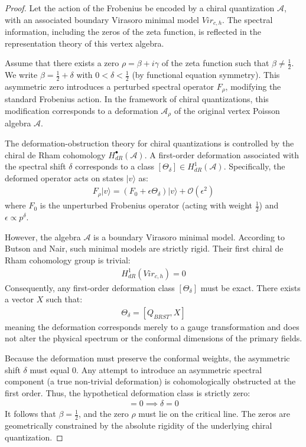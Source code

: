 \documentclass[
]{article}
\begin{document}
\begin{proof}
Let the action of the Frobenius be encoded by a chiral quantization $\mathcal{A}$, with an associated boundary Virasoro minimal model $Vir_{c,h}$. The spectral information, including the zeros of the zeta function, is reflected in the representation theory of this vertex algebra.

Assume that there exists a zero $\rho = \beta + i\gamma$ of the zeta function such that $\beta \neq \frac{1}{2}$. We write $\beta = \frac{1}{2} + \delta$ with $0 < \delta < \frac{1}{2}$ (by functional equation symmetry).
This asymmetric zero introduces a perturbed spectral operator $F_\rho$, modifying the standard Frobenius action.
In the framework of chiral quantizations, this modification corresponds to a deformation $\mathcal{A}_\rho$ of the original vertex Poisson algebra $\mathcal{A}$.

The deformation-obstruction theory for chiral quantizations is controlled by the chiral de Rham cohomology $H^\bullet_{dR}(\mathcal{A})$. A first-order deformation associated with the spectral shift $\delta$ corresponds to a class $[\Theta_\delta] \in H^1_{dR}(\mathcal{A})$.
Specifically, the deformed operator acts on states $| v \rangle$ as:
\begin{align*}
F_\rho | v \rangle = (F_0 + \epsilon \Theta_\delta) | v \rangle + \mathcal{O}(\epsilon^2)
\end{align*}
where $F_0$ is the unperturbed Frobenius operator (acting with weight $\frac{1}{2}$) and $\epsilon \propto p^\delta$.

However, the algebra $\mathcal{A}$ is a boundary Virasoro minimal model. According to Butson and Nair, such minimal models are strictly rigid. Their first chiral de Rham cohomology group is trivial:
\begin{align*}
H^1_{dR}(Vir_{c,h}) = 0
\end{align*}
Consequently, any first-order deformation class $[\Theta_\delta]$ must be exact. There exists a vector $X$ such that:
\begin{align*}
\Theta_\delta = [Q_{BRST}, X]
\end{align*}
meaning the deformation corresponds merely to a gauge transformation and does not alter the physical spectrum or the conformal dimensions of the primary fields.

Because the deformation must preserve the conformal weights, the asymmetric shift $\delta$ must equal $0$. Any attempt to introduce an asymmetric spectral component (a true non-trivial deformation) is cohomologically obstructed at the first order.
Thus, the hypothetical deformation class is strictly zero:
\begin{align*}
[\Theta_\delta] = 0 \implies \delta = 0
\end{align*}
It follows that $\beta = \frac{1}{2}$, and the zero $\rho$ must lie on the critical line. The zeros are geometrically constrained by the absolute rigidity of the underlying chiral quantization.
\end{proof}
\end{document}
